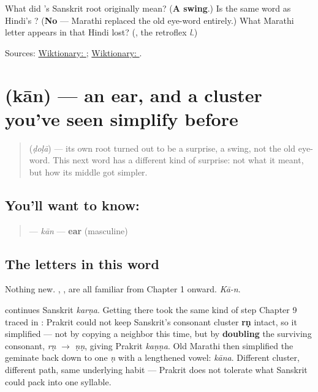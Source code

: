 \begin{tcolorbox}[breakable,colback=teal!4,colframe=teal!35!black,title={Before you move on}]
What did \textbf{}'s Sanskrit root originally mean? (\textbf{A swing}.) Is \textbf{} the same word as Hindi's \textbf{}? (\textbf{No} — Marathi replaced the old eye-word entirely.) What Marathi letter appears in \textbf{} that Hindi lost? (\textbf{}, the retroflex \emph{l}.)

Sources: \href{https://en.wiktionary.org/wiki/\%E0\%A4\%A1\%E0\%A5\%8B\%E0\%A4\%B3\%E0\%A4\%BE}{Wiktionary: }; \href{https://en.wiktionary.org/wiki/\%E0\%A4\%A6\%E0\%A5\%8B\%E0\%A4\%B2}{Wiktionary: }.
\end{tcolorbox}
\section[kān]{ (kān) — an ear, and a cluster you've seen simplify before}

\label{lesson:MR-C12-kaan}



\begin{quote}
\textbf{} (\emph{ḍoḷā}) — its own root turned out to be a surprise, a swing, not the old eye-word. This next word has a different kind of surprise: not what it meant, but how its middle got simpler.
\end{quote}

\subsection*{You'll want to know: }
\begin{quote}
\textbf{} — \emph{kān} — \textbf{ear} (masculine)
\end{quote}

\subsection*{The letters in this word}
Nothing new. \textbf{}, \textbf{}, \textbf{} are all familiar from Chapter 1 onward. \emph{Kā-n}.

\begin{sounds}
\textbf{} continues Sanskrit \textbf{} \emph{karṇa}. Getting there took the same kind of step Chapter 9 traced in \textbf{}: Prakrit could not keep Sanskrit's consonant cluster \textbf{rṇ} intact, so it simplified — not by copying a neighbor this time, but by \textbf{doubling} the surviving consonant, \emph{rṇ} $\to$ \emph{ṇṇ}, giving Prakrit \textbf{} \emph{kaṇṇa}. Old Marathi then simplified the geminate back down to one \emph{ṇ} with a lengthened vowel: \emph{kāna}. Different cluster, different path, same underlying habit — Prakrit does not tolerate what Sanskrit could pack into one syllable.
\end{sounds}

